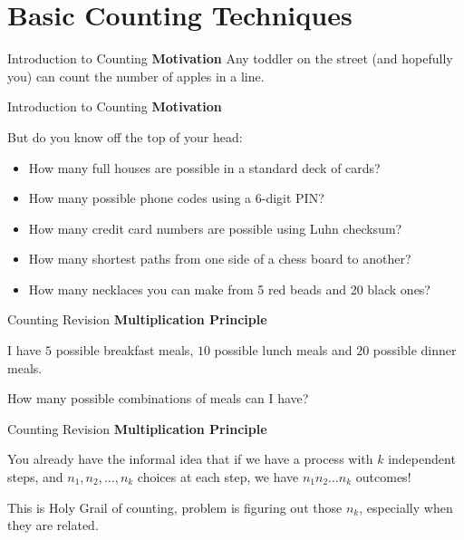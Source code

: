 \documentclass{beamer}
\begin{document}
 \section{Basic Counting Techniques}
% 

\begin{frame}{Introduction to Counting}
    \textbf{Motivation }
        Any toddler on the street (and hopefully you) can count the number of apples in a line.
    \vspace{0.5em}
\end{frame}

\begin{frame}{Introduction to Counting}
    \textbf{Motivation }
    
        But do you know off the top of your head:
        \begin{itemize}
            \item How many full houses are possible in a standard deck of cards?
            \item How many possible phone codes using a 6-digit PIN?
            \item How many credit card numbers are possible using Luhn checksum?
            \item How many shortest paths from one side of a chess board to another?
            \item How many necklaces you can make from 5 red beads and 20 black ones?
        \end{itemize}
    \vspace{0.5em}
\end{frame}

\begin{frame}{Counting Revision}
    \textbf{Multiplication Principle}
    
        I have $5$ possible breakfast meals, $10$ possible lunch meals and $20$ possible dinner meals. 

        How many possible combinations of meals can I have?
\end{frame}

\begin{frame}{Counting Revision}
    \textbf{Multiplication Principle}
    
        You already have the informal idea that if we have a process with $k$ independent steps, and $n_1, n_2, \dots, n_k$ choices at each step, we have $n_1n_2\dots n_k$ outcomes!

        This is Holy Grail of counting, problem is figuring out those $n_k$, especially when they are related.
\end{frame}
\end{document}
